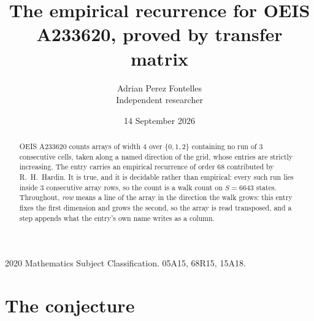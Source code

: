 \documentclass[11pt,a4paper]{article}
\title{The empirical recurrence for OEIS A233620, proved by transfer matrix}
\author{Adrian Perez Fontelles\\ \small Independent researcher}
\date{14 September 2026}
\theoremstyle{plain}
\theoremstyle{definition}
\begin{document}
\maketitle

\begin{abstract}
OEIS A233620 counts arrays of width $4$ over $\{0,1,2\}$ containing no run of $3$ consecutive
cells, taken along a named direction of the grid, whose entries are strictly increasing. The entry carries
an empirical recurrence of order $68$ contributed by R.~H.~Hardin. It is true, and it is
decidable rather than empirical: every such run lies inside $3$ consecutive array rows, so
the count is a walk count on $S=6643$ states.
 Throughout, \emph{row} means a line of the array in the direction the walk grows: this entry fixes the first dimension and grows the second, so the array is read transposed, and a step appends what the entry's own name writes as a column.\end{abstract}

\noindent\small 2020 Mathematics Subject Classification. 05A15, 68R15, 15A18.\normalsize

\section{The conjecture}
\end{document}
